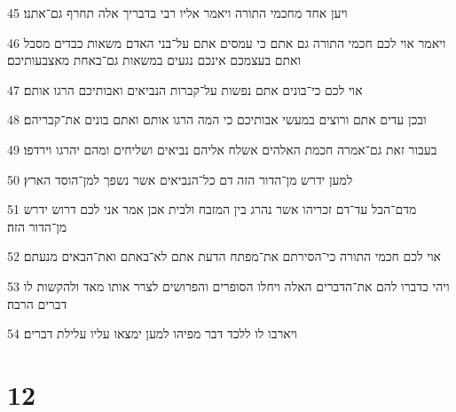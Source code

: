 \par 45 ויען אחד מחכמי התורה ויאמר אליו רבי בדבריך אלה תחרף גם־אתנו׃
\par 46 ויאמר אוי לכם חכמי התורה גם אתם כי עמסים אתם על־בני האדם משאות כבדים מסבל ואתם בעצמכם אינכם נגעים במשאות גם־באחת מאצבעותיכם׃
\par 47 אוי לכם כי־בונים אתם נפשות על־קברות הנביאים ואבותיכם הרגו אותם׃
\par 48 ובכן עדים אתם ורוצים במעשי אבותיכם כי המה הרגו אותם ואתם בונים את־קבריהם׃
\par 49 בעבור זאת גם־אמרה חכמת האלהים אשלח אליהם נביאים ושליחים ומהם יהרגו וירדפו׃
\par 50 למען ידרש מן־הדור הזה דם כל־הנביאים אשר נשפך למן־הוסד הארץ׃
\par 51 מדם־הבל עד־דם זכריהו אשר נהרג בין המזבח ולבית אכן אמר אני לכם דרוש ידרש מן־הדור הזה׃
\par 52 אוי לכם חכמי התורה כי־הסירתם את־מפתח הדעת אתם לא־באתם ואת־הבאים מנעתם׃
\par 53 ויהי כדברו להם את־הדברים האלה ויחלו הסופרים והפרושים לצרר אותו מאד ולהקשות לו דברים הרבה׃
\par 54 ויארבו לו ללכד דבר מפיהו למען ימצאו עליו עלילת דברים׃

\chapter{12}

